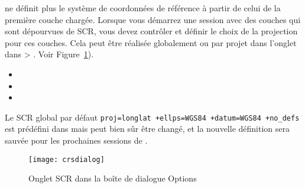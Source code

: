 \qg ne définit plus le système de coordonnées de référence à partir de 
celui de la première couche chargée. Lorsque vous démarrez
une session \qg avec des couches qui sont dépourvues de SCR, vous devez
contrôler et définir le choix de la projection pour ces couches. Cela peut
être réalisée globalement ou par projet dans l'onglet  dans  > . 
Voir Figure~\ref{fig:crsdialog}).

\begin{itemize}[label=--]
\item {}
\item {}
\item {}
\end{itemize}

Le SCR global par défaut \texttt{proj=longlat +ellps=WGS84 +datum=WGS84
 +no\_defs} est prédéfini dans \qg mais peut bien sûr être changé, et la
nouvelle définition sera sauvée pour les prochaines sessions de \qg.

\begin{figure}[ht]
   \begin{center}
   \caption{Onglet SCR dans la boîte de dialogue Options \qg
\nixcaption}\label{fig:crsdialog}\smallskip
   \texttt{[image: crsdialog]}
\end{center}
\end{figure}

